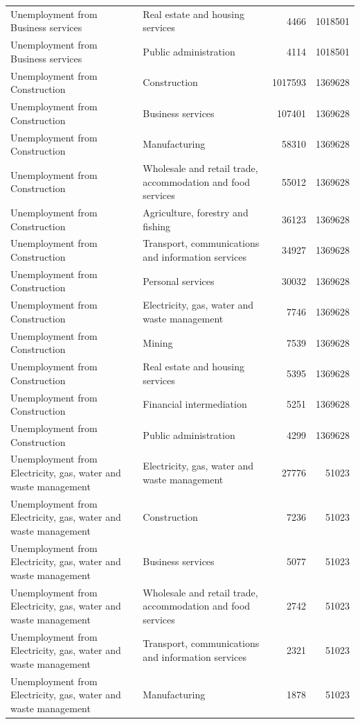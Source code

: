 \begin{longtable}{llrr}
Unemployment from Business services & Real estate and housing services & 4466 & 1018501 \\
Unemployment from Business services & Public administration & 4114 & 1018501 \\
Unemployment from Construction & Construction & 1017593 & 1369628 \\
Unemployment from Construction & Business services & 107401 & 1369628 \\
Unemployment from Construction & Manufacturing & 58310 & 1369628 \\
Unemployment from Construction & Wholesale and retail trade, accommodation and food services & 55012 & 1369628 \\
Unemployment from Construction & Agriculture, forestry and fishing & 36123 & 1369628 \\
Unemployment from Construction & Transport, communications and information services & 34927 & 1369628 \\
Unemployment from Construction & Personal services & 30032 & 1369628 \\
Unemployment from Construction & Electricity, gas, water and waste management & 7746 & 1369628 \\
Unemployment from Construction & Mining & 7539 & 1369628 \\
Unemployment from Construction & Real estate and housing services & 5395 & 1369628 \\
Unemployment from Construction & Financial intermediation & 5251 & 1369628 \\
Unemployment from Construction & Public administration & 4299 & 1369628 \\
Unemployment from Electricity, gas, water and waste management & Electricity, gas, water and waste management & 27776 & 51023 \\
Unemployment from Electricity, gas, water and waste management & Construction & 7236 & 51023 \\
Unemployment from Electricity, gas, water and waste management & Business services & 5077 & 51023 \\
Unemployment from Electricity, gas, water and waste management & Wholesale and retail trade, accommodation and food services & 2742 & 51023 \\
Unemployment from Electricity, gas, water and waste management & Transport, communications and information services & 2321 & 51023 \\
Unemployment from Electricity, gas, water and waste management & Manufacturing & 1878 & 51023 \\

\end{longtable}
